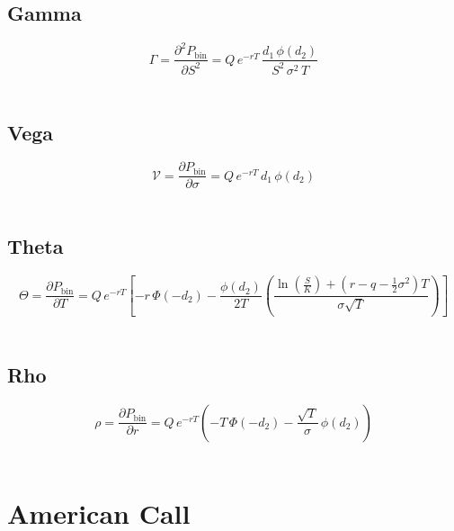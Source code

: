 \documentclass[12pt,a4paper]{article}
\begin{document}
\[
  \begin{aligned}
  \end{aligned}
\]

\subsection{Gamma}
\[
  \boxed{\Gamma = \frac{\partial^2 P_{\mathrm{bin}}}{\partial S^2}
  = Q\, e^{-rT}\, \frac{d_1\,\phi(d_2)}{S^2\,\sigma^2\,T}}
\]

\[
  \begin{aligned}
  \end{aligned}
\]

\subsection{Vega}
\[
  \boxed{\mathcal{V} = \frac{\partial P_{\mathrm{bin}}}{\partial \sigma}
  = Q\, e^{-rT}\, d_1\,\phi(d_2)}
\]

\[
  \begin{aligned}
  \end{aligned}
\]

\subsection{Theta}
\[
  \boxed{\Theta = \frac{\partial P_{\mathrm{bin}}}{\partial T}
  = Q\, e^{-rT}\!\left[
  -r\,\Phi(-d_2)
  - \frac{\phi(d_2)}{2T}
    \left(
      \frac{\ln(\tfrac{S}{K}) + (r - q - \tfrac{1}{2}\sigma^2)T}{\sigma\sqrt{T}}
    \right)
  \right]}
\]

\[
  \begin{aligned}
  \end{aligned}
\]

\subsection{Rho}
\[
  \boxed{\rho = \frac{\partial P_{\mathrm{bin}}}{\partial r}
  = Q\, e^{-rT}\!\left(
    -T\,\Phi(-d_2)
    - \frac{\sqrt{T}}{\sigma}\,\phi(d_2)
  \right)}
\]

\[
  \begin{aligned}
  \end{aligned}
\]

\newpage

\section{American Call}
\end{document}
